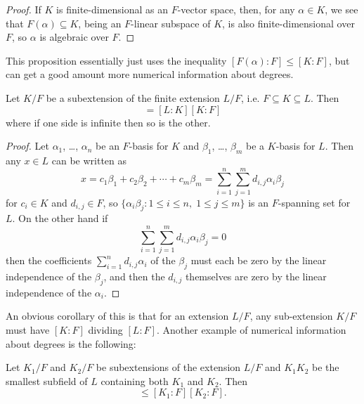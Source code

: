 \documentclass[10pt]{article}
\begin{document}
\begin{proof}
    If $K$ is finite-dimensional as an $F$-vector space,
    then, for any $\alpha\in K$,
    we see that $F(\alpha)\subseteq K$, being an $F$-linear subspace of $K$,
    is also finite-dimensional over $F$, so $\alpha$ is algebraic over $F$.
\end{proof}

This proposition essentially just uses the inequality
$[F(\alpha) : F] \le [K : F]$,
but can get a good amount more numerical information about degrees.

\begin{prop}
    \label{prop:tower-law}
    Let $K/F$ be a subextension of the finite extension $L/F$,
    i.e. $F\subseteq K\subseteq L$. Then
    \begin{equation*}
	[L : F] = [L : K][K : F]
    \end{equation*}
    where if one side is infinite then so is the other.
\end{prop}

\begin{proof}
    Let $\alpha_1$, \dots, $\alpha_n$ be an $F$-basis for $K$
    and $\beta_1$, \dots, $\beta_m$ be a $K$-basis for $L$.
    Then any $x\in L$ can be written as
    \begin{equation*}
        x = c_1\beta_1 + c_2\beta_2 + \cdots + c_m\beta_m
	= \sum_{i=1}^n\sum_{j=1}^m d_{i,j}\alpha_i\beta_j
    \end{equation*}
    for $c_i\in K$ and $d_{i,j}\in F$,
    so $\{\alpha_i\beta_j : 1\le i\le n,\; 1\le j\le m\}$ 
    is an $F$-spanning set for $L$. On the other hand if
    \begin{equation*}
	\sum_{i=1}^n\sum_{j=1}^m d_{i,j}\alpha_i\beta_j = 0
    \end{equation*}
    then the coefficients $\sum_{i=1}^n d_{i,j}\alpha_i$
    of the $\beta_j$ must each be zero
    by the linear independence of the $\beta_j$,
    and then the $d_{i,j}$ themselves are zero
    by the linear independence of the $\alpha_i$.
\end{proof}

An obvious corollary of this is that
for an extension $L/F$, any sub-extension $K/F$ must have
$[K : F]$ dividing $[L : F]$. Another example of
numerical information about degrees is the following:

\begin{prop}
    \label{prop:product-ineq}
    Let $K_1/F$ and $K_2/F$ be subextensions of the extension $L/F$
    and $K_1K_2$ be the smallest subfield of $L$ containing
    both $K_1$ and $K_2$. Then
    \begin{equation*}
	[K_1K_2 : F] \le [K_1 : F][K_2 : F].
    \end{equation*}
\end{prop}
\end{document}
